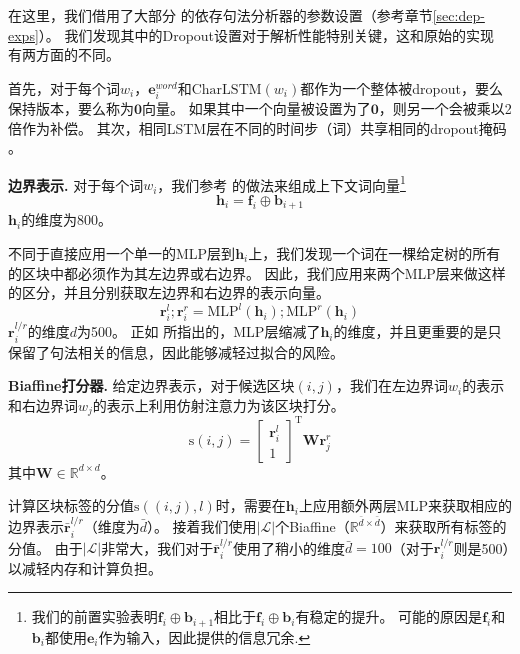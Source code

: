 在这里，我们借用了大部分 \citet{dozat-etal-2017-biaffine}的依存句法分析器的参数设置（参考章节\ref{sec:dep-exps}）。
我们发现其中的Dropout设置对于解析性能特别关键，这和原始的实现 \citep{stern-etal-2017-minimal}有两方面的不同。

首先，对于每个词$w_i$，$\mathbf{e}^{word}_i$和$\mathrm{CharLSTM}(w_i)$都作为一个整体被dropout，要么保持版本，要么称为$\mathbf{0}$向量。
如果其中一个向量被设置为了$\mathbf{0}$，则另一个会被乘以2倍作为补偿。
其次，相同LSTM层在不同的时间步（词）共享相同的dropout掩码 \citep{yarin-etal-2016-dropout}。

\noindent\textbf{边界表示.}
对于每个词$w_i$，我们参考 \citet{stern-etal-2017-minimal}的做法来组成上下文词向量\footnote{我们的前置实验表明$\mathbf{f}_i \oplus \mathbf{b}_{i+1}$相比于$\mathbf{f}_i \oplus \mathbf{b}_i$有稳定的提升。
	可能的原因是$\mathbf{f}_i$和$\mathbf{b}_i$都使用$\mathbf{e}_i$作为输入，因此提供的信息冗余.}
\begin{equation}
	\mathbf{h}_i = \mathbf{f}_i \oplus \mathbf{b}_{i+1}
\end{equation}
$\mathbf{h}_i$的维度为800。

不同于直接应用一个单一的MLP层到$\mathbf{h}_i$上，我们发现一个词在一棵给定树的所有的区块中都必须作为其左边界或右边界。
因此，我们应用来两个MLP层来做这样的区分，并且分别获取左边界和右边界的表示向量。
\begin{equation}
	\label{mlp-boundaries}
	\mathbf{r}_i^{l}; \mathbf{r}_i^{r} =\mathrm{MLP}^{l} \left( \mathbf{h}_i \right); \mathrm{MLP}^{r} \left( \mathbf{h}_i \right)
\end{equation}
$\mathbf{r}_i^{l/r}$的维度$d$为500。
正如 \citet{dozat-etal-2017-biaffine}所指出的，MLP层缩减了$\mathbf{h}_i$的维度，并且更重要的是只保留了句法相关的信息，因此能够减轻过拟合的风险。

\noindent\textbf{Biaffine打分器.}
给定边界表示，对于候选区块$(i,j)$，我们在左边界词$w_i$的表示和右边界词$w_j$的表示上利用仿射注意力为该区块打分。
\begin{equation} \label{eq:con-biaffine}
	\mathrm{s}(i,j) =  \left[
		\begin{array}{c}
			\mathbf{r}_{i}^{l} \\
			1                  
		\end{array}
	\right]^\mathrm{T}
	\mathbf{W} \mathbf{r}_{j}^{r}
\end{equation}
其中$\mathbf{W} \in \mathbb{R}^{d \times d}$。

计算区块标签的分值$\mathrm{s}((i,j),l)$时，需要在$\mathbf{h}_i$上应用额外两层MLP来获取相应的边界表示$\bar{\mathbf{r}}^{l/r}_i$（维度为$\bar{d}$）。
接着我们使用$|\mathcal{L}|$个Biaffine（$\mathbb{R}^{\bar{d} \times \bar{d}}$）来获取所有标签的分值。
由于$|\mathcal{L}|$非常大，我们对于$\bar{\mathbf{r}}^{l/r}_i$使用了稍小的维度$\bar{d}=100$（对于${\mathbf{r}}^{l/r}_i$则是500）以减轻内存和计算负担。

